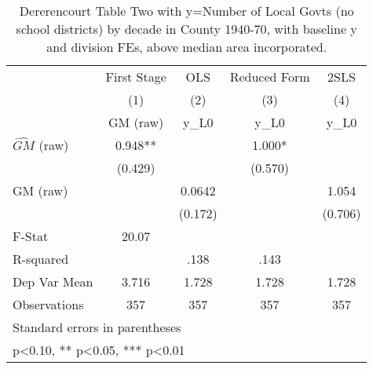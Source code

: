 \begin{table}[htbp]\centering
\def\sym#1{\ifmmode^{#1}\else\(^{#1}\)\fi}
\caption{Dererencourt Table Two with y=Number of Local Govts (no school districts) by decade in County 1940-70, with baseline y and division FEs, above median area incorporated.}
\begin{tabular}{l*{4}{c}}
\toprule
                    & First Stage   &         OLS   &Reduced Form   &        2SLS   \\
                    &\multicolumn{1}{c}{(1)}&\multicolumn{1}{c}{(2)}&\multicolumn{1}{c}{(3)}&\multicolumn{1}{c}{(4)}\\
                    &\multicolumn{1}{c}{GM  (raw)}&\multicolumn{1}{c}{y\_L0}&\multicolumn{1}{c}{y\_L0}&\multicolumn{1}{c}{y\_L0}\\
\midrule
$\hat{GM}$ (raw)    &       0.948** &               &       1.000*  &               \\
                    &     (0.429)   &               &     (0.570)   &               \\
\addlinespace
GM  (raw)           &               &      0.0642   &               &       1.054   \\
                    &               &     (0.172)   &               &     (0.706)   \\
\midrule
F-Stat              &       20.07   &               &               &               \\
R-squared           &               &        .138   &        .143   &               \\
Dep Var Mean        &       3.716   &       1.728   &       1.728   &       1.728   \\
Observations        &         357   &         357   &         357   &         357   \\
\bottomrule
\multicolumn{5}{l}{\footnotesize Standard errors in parentheses}\\
\multicolumn{5}{l}{\footnotesize * p<0.10, ** p<0.05, *** p<0.01}\\
\end{tabular}
\end{table}
